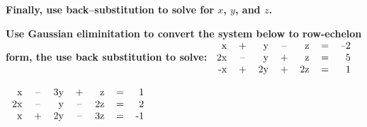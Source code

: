 \documentclass{exam}
\begin{document}
\begin{questions}
\textbf{
Finally, use back--substitution to solve for $x$, $y$, and $z$. 
} 

\question
\textbf{Use Gaussian eliminitation to convert the system below to row-echelon form, the use back substitution to solve:}
$
\begin{tabular}{r c r c r c r }
x & + & y & --& z & = & --2 \\

2x & -- & y & + & z & = & 5  \\

-x & + & 2y & + & 2z & = & 1 \\
\end{tabular}
$

\question
$
\begin{tabular}{r c r c r c r }
x & -- & 3y & +& z & = & 1 \\

2x & -- & y & -- & 2z & = & 2  \\

x & + & 2y & -- & 3z & = & -1 \\
\end{tabular}
$
\end{questions}
\end{document}
